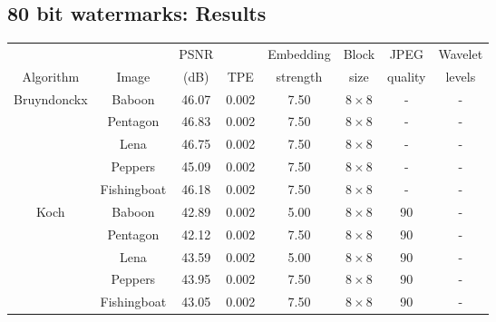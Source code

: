\documentclass[12pt]{report}
\begin{document}
\subsection{80 bit watermarks: Results}
\label{sub:80bitWm}
\begin{table}[htb]
\tiny
        \begin{center}
                \begin{tabular}{|c|c|c|c|c|c|c|c|} \hline
				& 		 & PSNR		&      	& Embedding   	& Block		&JPEG 		& Wavelet \\
                Algorithm	&Image           & (dB)     	& TPE  	& strength    	& size		&quality 	& levels\\ \hline
                Bruyndonckx	&Baboon          & 46.07        & 0.002	& 7.50           & $8\times 8$ 	&-		&-\\ \cline{2-8}
                		&Pentagon        & 46.83        & 0.002	& 7.50           & $8\times 8$ 	&-		&-\\ \cline{2-8}
                		&Lena            & 46.75        & 0.002	& 7.50           & $8\times 8$ 	&-		&-\\ \cline{2-8}
                		&Peppers         & 45.09        & 0.002	& 7.50           & $8\times 8$ 	&-		&-\\ \cline{2-8}
                		&Fishingboat     & 46.18        & 0.002	& 7.50           & $8\times 8$ 	&-		&-\\ \hline\hline
	
		Koch		 &Baboon          & 42.89        & 0.002 & 5.00           & $8\times 8$   &90              &-\\ \cline{2-8}
                		&Pentagon        & 42.12        & 0.002 & 7.50           & $8\times 8$   &90              &-\\ \cline{2-8}
                		&Lena            & 43.59        & 0.002 & 5.00           & $8\times 8$   &90              &-\\ \cline{2-8}
                		&Peppers         & 43.95        & 0.002 & 7.50           & $8\times 8$   &90              &-\\ \cline{2-8}
                		&Fishingboat     & 43.05        & 0.002 & 7.50           & $8\times 8$   &90              &-\\ \hline\hline	


\end{tabular}
\end{center}
\end{table}
\end{document}
